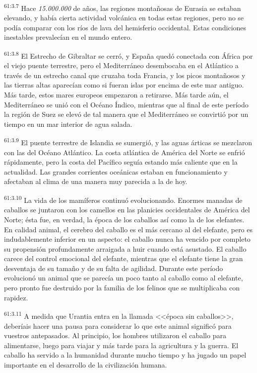 \par
\textsuperscript{61:3.7} Hace \textit{15.000.000} de años, las regiones montañosas de Eurasia se estaban elevando, y había cierta actividad volcánica en todas estas regiones, pero no se podía comparar con los ríos de lava del hemisferio occidental. Estas condiciones inestables prevalecían en el mundo entero.

\par
\textsuperscript{61:3.8} El Estrecho de Gibraltar se cerró, y España quedó conectada con África por el viejo puente terrestre, pero el Mediterráneo desembocaba en el Atlántico a través de un estrecho canal que cruzaba toda Francia, y los picos montañosos y las tierras altas aparecían como si fueran islas por encima de este mar antiguo. Más tarde, estos mares europeos empezaron a retirarse. Más tarde aún, el Mediterráneo se unió con el Océano Índico, mientras que al final de este período la región de Suez se elevó de tal manera que el Mediterráneo se convirtió por un tiempo en un mar interior de agua salada.

\par
\textsuperscript{61:3.9} El puente terrestre de Islandia se sumergió, y las aguas árticas se mezclaron con las del Océano Atlántico. La costa atlántica de América del Norte se enfrió rápidamente, pero la costa del Pacífico seguía estando más caliente que en la actualidad. Las grandes corrientes oceánicas estaban en funcionamiento y afectaban al clima de una manera muy parecida a la de hoy.

\par
\textsuperscript{61:3.10} La vida de los mamíferos continuó evolucionando. Enormes manadas de caballos se juntaron con los camellos en las planicies occidentales de América del Norte; ésta fue, en verdad, la época de los caballos así como la de los elefantes. En calidad animal, el cerebro del caballo es el más cercano al del elefante, pero es indudablemente inferior en un aspecto: el caballo nunca ha vencido por completo su propensión profundamente arraigada a huir cuando está asustado. El caballo carece del control emocional del elefante, mientras que el elefante tiene la gran desventaja de su tamaño y de su falta de agilidad. Durante este período evolucionó un animal que se parecía un poco tanto al caballo como al elefante, pero pronto fue destruido por la familia de los felinos que se multiplicaba con rapidez.

\par
\textsuperscript{61:3.11} A medida que Urantia entra en la llamada <<época sin caballos>>, deberíais hacer una pausa para considerar lo que este animal significó para vuestros antepasados. Al principio, los hombres utilizaron el caballo para alimentarse, luego para viajar y más tarde para la agricultura y la guerra. El caballo ha servido a la humanidad durante mucho tiempo y ha jugado un papel importante en el desarrollo de la civilización humana.

